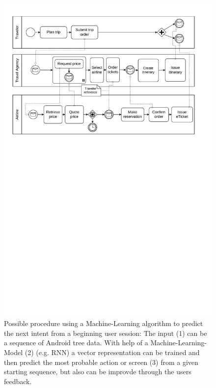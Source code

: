 \begin{figure}
  \centering
  \includegraphics[width=\textwidth]{graphics/choreography.pdf}
  \caption{Possible procedure using a Machine-Learning algorithm to predict the next intent from a beginning user session: The input (1) can be a sequence of Android tree data. With help of a Machine-Learning-Model (2) (e.g. RNN) a vector representation can be trained and then predict the most probable action or screen (3) from a given starting sequence, but also can be improvde through the users feedback.}
  \label{fig:encode-decode}
\end{figure}

